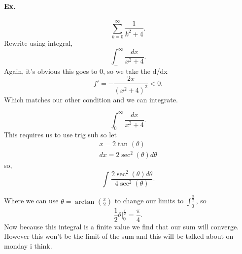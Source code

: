 \paragraph{Ex.}
\[
\sum_{ k=0 } ^{ \infty } \frac{ 1 }{ k^2+4 } 
.\] 
Rewrite using integral,
\[
\int_{ - }^{ \infty } \frac{ dx }{ x^2+4 } 
.\] 
Again, it's obvious this goes to 0, so we take the d/dx
\[
f'=-\frac{ 2x }{ \left( x^2+4 \right) ^2 } <0
.\] 
Which matches our other condition and we can integrate.

\[
\int_{ 0 }^{ \infty } \frac{ dx }{ x^2+4 } 
.\] 
This requires us to use trig sub so let
\begin{gather*}
x=2\tan^{  } \left( \theta \right) \\
dx=2\sec^{ 2 } \left( \theta \right) d\theta
\end{gather*}
so,
\[
\int_{  }^{ } \frac{ 2\sec^{ 2 } \left( \theta \right) d\theta }{ 4\sec^{ 2 } \left( \theta \right)  }
.\] 

Where we can use $ \theta = \arctan^{  }\left( \frac{ x }{ 2 }  \right) $ to change our limits to $ \int_{ 0 }^{ \frac{ \pi }{ 2 }  }  $, so
\[
\frac{ 1 }{ 2 } \theta \bigg|_{ 0 }^{ \frac{ \pi }{ 2 }  } =\frac{ \pi }{ 4 }
.\] 
Now because this integral is a finite value we find that our sum will converge. However this won't be the limit of the sum and this will be talked about on monday i think.
